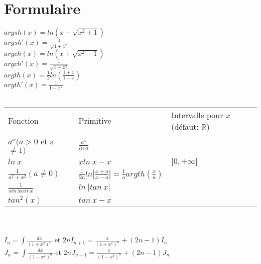 \documentclass{article}
\begin{document}
	\section{Formulaire}
	
		$argsh(x) = ln(x + \sqrt{x^2 + 1})$\\
		$argsh'(x) = \frac{1}{\sqrt{1 + x^2}}$\\
		$argch(x) = ln(x + \sqrt{x^2 - 1})$\\
		$argch'(x) = \frac{1}{\sqrt{1 - x^2}}$\\
		$argth(x) = \frac{1}{2}ln \left(\frac{1+x}{1-x}\right)$\\
		$argth'(x) = \frac{1}{1 - x^2}$\\\\
	
		\begin{tabular}{lll}
			Fonction & Primitive & Intervalle pour $x$ (défaut: $\mathbb{R}$)\\
			$a^x (a > 0$ et a $\neq 1)$ & $\frac{a^x}{ln\ a}$\\
			$ln\ x$ & $xln\ x - x$ & $]0, +\infty[$\\
			$\frac{1}{a^2 + x^2} (a \neq 0)$ & $\frac{1}{2a}ln \left|\frac{x+a}{x-a}\right|=\frac{1}{a}argth \left(\frac{x}{a}\right)$\\
			$\frac{1}{sin\ x cos\ x}$ & $ln\ \left|tan\ x\right|$\\
			$tan^2(x)$ & $tan\ x - x$\\
			
		\end{tabular}\\\\
		
			$I_n = \int \frac{dx}{(1+x^2)^n}$ et $2nI_{n+1} = \frac{x}{(1 + x^2)^n} + (2n - 1)I_n$\\
			$J_n = \int \frac{dx}{(1-x^2)^n}$ et $2nJ_{n+1} = \frac{x}{(1 - x^2)^n} + (2n - 1)J_n$
\end{document}
